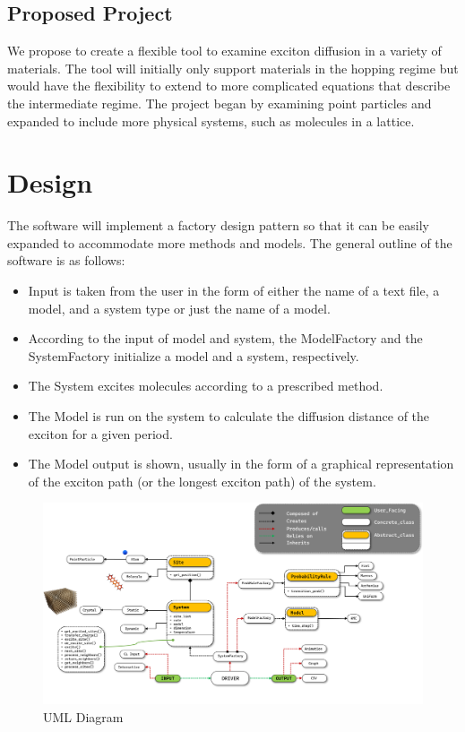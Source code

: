 \documentclass{article}
\begin{document}
\subsection{Proposed Project}

We propose to create a flexible tool to examine exciton diffusion in a variety of materials. The tool will initially only support materials in the hopping regime but would have the flexibility to extend to more complicated equations that describe the intermediate regime. The project began by examining point particles and expanded to include more physical systems, such as molecules in a lattice.

\section{Design}

The software will implement a factory design pattern so that it can be easily expanded to accommodate more methods and models. The general outline of the software is as follows:

\begin{itemize}
    \item Input is taken from the user in the form of either the name of a text file, a model, and a system type or just the name of a model.
    \item According to the input of model and system, the ModelFactory and the SystemFactory initialize a model and a system, respectively.
    \item The System excites molecules according to a prescribed method.
    \item The Model is run on the system to calculate the diffusion distance of the exciton for a given period.
    \item The Model output is shown, usually in the form of a graphical representation of the exciton path (or the longest exciton path) of the system.
\end{itemize}

\begin{figure}
    \centering
   \includegraphics[scale=0.5]{UML_2.png}
    \caption{UML Diagram}
    \label{fig:my_label}
\end{figure}
\end{document}
